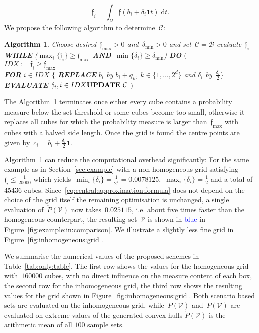 \documentclass[letterpaper, 10pt, conference]{ieeeconf} %
\newtheorem{algo}[thm]{Algorithm}
\providecommand{\bfa}[1]{\mathbf{#1}}
\begin{document}
\[
\mathfrak{f}_i=\int_{\mathcal Q}\mathfrak{f}(b_i+\delta_i\bfa{1} t) \; \mathrm d t.
\]
%
We propose the following algorithm to determine~$\mathcal C$:
%
\begin{algo}\label{algo:non:homo:cubes}
Choose desired~$\mathfrak{f}_{\max}>0$ and~$\delta_{\min}>0$ and set~$\mathcal C=\mathcal B$ evaluate~$\mathfrak{f}_i$\\
\textbf{WHILE} ($\max_i\{\mathfrak{f}_i\}\geq\mathfrak{f}_{\max}$~\textbf{AND}~$\min\{\delta_i\}\geq\delta_{\min}$) \textbf{DO} $\bigl($\\
$IDX := \mathfrak{f}_i\geq \mathfrak{f}_{\max}$\\
\textbf{FOR} $i\in IDX$ $\{$ \textbf{REPLACE} $b_i$ by $b_i+q_k$, $k\in\{1,\dots,2^d\}$ 
and $\delta_i$ by~$\frac{\delta_i}{2}\}$\\
\textbf{EVALUATE}~$\mathfrak f_i, i\in IDX\\
\textbf{UPDATE}~\mathcal C$
$\bigr)$
\end{algo}
%
The Algorithm~\ref{algo:non:homo:cubes} terminates once either every cube contains a probability measure below the set threshold or some cubes become too small, otherwise it replaces all cubes for which the probability measure is larger than~$\mathfrak{f}_{\max}$ with cubes with a halved side length.
%
Once the grid is found the centre points are given by~$c_i=b_i+\frac{\delta_i}{2}\bfa{1}$.
%


%
Algorithm~\ref{algo:non:homo:cubes} can reduce the computational overhead significantly:
%
For the same example as in Section~\ref{sec:example} with a non-homogeneous grid satisfying~$\mathfrak{f}_i\leq\frac{1}{20000}$ which yields~$\min_i\{\delta_i\}=\frac{1}{2^7}=0.0078125$,~$\max_i\{\delta_i\}=\frac{1}{2}$ and a total of~$45436$ cubes.
%
Since~\eqref{eq:central:approximation:formula} does not depend on the choice of the grid itself the remaining optimisation is unchanged, a single evaluation of~$\mathring{P}(\mathcal V)$ now takes~$0.025115$, i.e. about five times  faster than the homogeneous counterpart, the resulting set~$\mathcal V$ is shown in \textcolor{blue}{blue} in Figure~\ref{fig:example:in:comparison}.
%
We illustrate a slightly less fine grid in Figure~\ref{fig:inhomogeneous:grid}.

%
We summarise the numerical values of the proposed schemes in Table~\ref{tab:only:table}.
%
The first row shows the values for the homogeneous grid with~$160000$ cubes, with no direct influence on the measure content of each box, the second row for the inhomogeneous grid, the third row shows the resulting values for the grid shown in Figure~\ref{fig:inhomogeneous:grid}. 
%
Both scenario based sets are evaluated on the inhomogeneous grid, while~$\underline{P}(\mathcal V)$ and~$\overline{P}(\mathcal V)$ are evaluated on extreme values of the generated convex hulls $\mathring{P}(\mathcal V)$ is the arithmetic mean of all $100$ sample sets.
%
\end{document}
